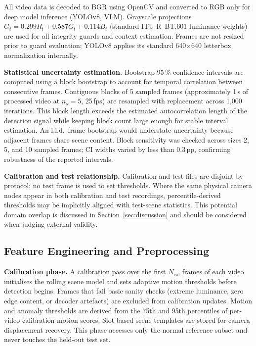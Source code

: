 \documentclass[sensors,article,submit,pdftex,moreauthors]{Definitions/mdpi}
\begin{document}
All video data is decoded to BGR using OpenCV and converted to RGB only for deep model inference (YOLOv8, VLM). Grayscale projections $G_t = 0.299R_t + 0.587G_t + 0.114B_t$ (standard ITU-R~BT.601 luminance weights) are used for all integrity guards and context estimation. Frames are not resized prior to guard evaluation; YOLOv8 applies its standard 640$\times$640 letterbox normalization internally.
 
\textbf{Statistical uncertainty estimation.}
Bootstrap 95\,\% confidence intervals are computed using a block bootstrap to account for temporal correlation between consecutive frames. Contiguous blocks of 5 sampled frames (approximately 1\,s of processed video at $n_s{=}5$, 25\,fps) are resampled with replacement across 1{,}000 iterations. This block length exceeds the estimated autocorrelation length of the detection signal while keeping block count large enough for stable interval estimation. An i.i.d.\ frame bootstrap would understate uncertainty because adjacent frames share scene content. Block sensitivity was checked across sizes 2, 5, and 10 sampled frames; CI widths varied by less than 0.3\,pp, confirming robustness of the reported intervals.
 
\textbf{Calibration and test relationship.} Calibration and test files are disjoint by protocol; no test frame is used to set thresholds. Where the same physical camera nodes appear in both calibration and test recordings, percentile-derived thresholds may be implicitly aligned with test-scene statistics. This potential domain overlap is discussed in Section~\ref{sec:discussion} and should be considered when judging external validity.
 
\subsection{Feature Engineering and Preprocessing}
 
\textbf{Calibration phase.} A calibration pass over the first $N_{\text{cal}}$ frames of each video initialises the rolling scene model and sets adaptive motion thresholds before detection begins. Frames that fail basic sanity checks (extreme luminance, zero edge content, or decoder artefacts) are excluded from calibration updates. Motion and anomaly thresholds are derived from the 75th and 95th percentiles of per-video calibration motion scores. Slot-based scene templates are stored for camera-displacement recovery. This phase accesses only the normal reference subset and never touches the held-out test set.
 
\end{document}
